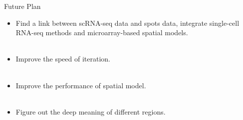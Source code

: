 \documentclass[10 pt]{beamer}
\begin{document}
\begin{frame}{Future Plan}
\begin{itemize}
	\item Find a link between scRNA-seq data and spots data, integrate single-cell RNA-seq methods and microarray-based spatial models.
		~\\
	~\\
	\item Improve the speed of iteration.
		~\\
	~\\
	\item Improve the performance of spatial model.
	~\\
	~\\
	\item Figure out the deep meaning of different regions.
	\end{itemize}
\end{frame}
\end{document}
